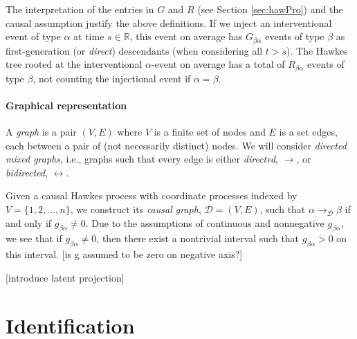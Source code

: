\documentclass[accepted]{uai2021} %
\begin{document}
The interpretation of the entries in $G$ and $R$ (see Section 
\ref{sec:hawPro}) and the causal assumption justify the above definitions. If 
we inject an 
interventional event of type $\alpha$ at time $s \in \mathbb{R}$, this 
event on average has $G_{\beta\alpha}$ events 
of type $\beta$ as first-generation (or \emph{direct}) descendants (when 
considering all $t > s$). The Hawkes tree rooted at the 
interventional $\alpha$-event on average has a total of $R_{\beta\alpha}$ 
events of 
type $\beta$, not counting the injectional event if $\alpha=\beta$. 


\paragraph{Graphical representation}

A {\it graph} is a pair $(V,E)$ where $V$ is a finite set of nodes and $E$ is a 
set edges, each between a pair of (not necessarily distinct) nodes. We will  
consider {\it directed mixed graphs}, i.e., graphs such that every edge is 
either \emph{directed}, $\rightarrow$, or \emph{bidirected}, $\leftrightarrow$. 

Given a causal Hawkes process with coordinate processes indexed by $V = 
\{1,2,\ldots,n\}$, we construct its \emph{causal graph}, $\mathcal{D} = (V,E)$, 
such that 
$\alpha \rightarrow_\mathcal{D} \beta$ if and only if $g_{\beta\alpha} \neq 0$. 
Due 
to the assumptions of continuous and nonnegative $g_{\beta\alpha}$, we see 
that if $g_{\beta\alpha}\neq 0$, then there exist a nontrivial interval such 
that $g_{\beta\alpha} > 0$ on this interval. [is g assumed to be zero on 
negative axis?]

[introduce latent projection]



\section{Identification}
\end{document}
